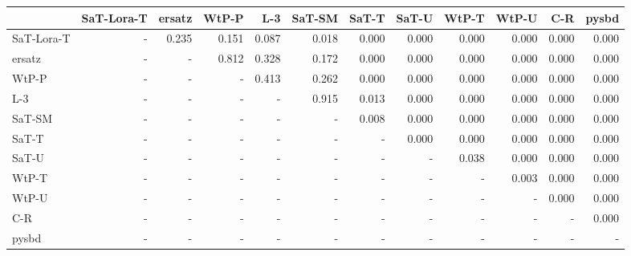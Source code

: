 \begin{tabular}{lrrrrrrrrrrr}
\toprule
 & SaT-Lora-T & ersatz & WtP-P & L-3 & SaT-SM & SaT-T & SaT-U & WtP-T & WtP-U & C-R & pysbd \\
\midrule
SaT-Lora-T & - & 0.235 & 0.151 & 0.087 & 0.018 & 0.000 & 0.000 & 0.000 & 0.000 & 0.000 & 0.000 \\
ersatz & - & - & 0.812 & 0.328 & 0.172 & 0.000 & 0.000 & 0.000 & 0.000 & 0.000 & 0.000 \\
WtP-P & - & - & - & 0.413 & 0.262 & 0.000 & 0.000 & 0.000 & 0.000 & 0.000 & 0.000 \\
L-3 & - & - & - & - & 0.915 & 0.013 & 0.000 & 0.000 & 0.000 & 0.000 & 0.000 \\
SaT-SM & - & - & - & - & - & 0.008 & 0.000 & 0.000 & 0.000 & 0.000 & 0.000 \\
SaT-T & - & - & - & - & - & - & 0.000 & 0.000 & 0.000 & 0.000 & 0.000 \\
SaT-U & - & - & - & - & - & - & - & 0.038 & 0.000 & 0.000 & 0.000 \\
WtP-T & - & - & - & - & - & - & - & - & 0.003 & 0.000 & 0.000 \\
WtP-U & - & - & - & - & - & - & - & - & - & 0.000 & 0.000 \\
C-R & - & - & - & - & - & - & - & - & - & - & 0.000 \\
pysbd & - & - & - & - & - & - & - & - & - & - & - \\
\bottomrule
\end{tabular}

